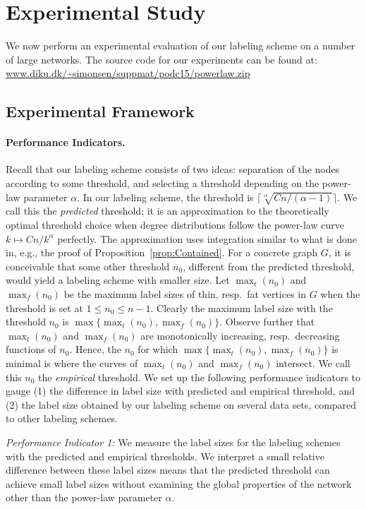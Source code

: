 \documentclass{article}
\theoremstyle{remark}
\begin{document}
\section{Experimental Study}

We now  perform an experimental evaluation of our labeling scheme on a number of large networks.
The source code for our experiments can be found at: \url{www.diku.dk/\~simonsen/suppmat/podc15/powerlaw.zip}

\subsection{Experimental Framework}\label{Sec:Experimental}
\paragraph{Performance Indicators.}
Recall that our labeling scheme consists of two ideas: separation of the nodes according to some threshold, and selecting a threshold depending on the power-law parameter $\alpha$.
In our labeling scheme, the threshold  is $\lceil \sqrt[\alpha]{C n/(\alpha-1)} \rceil$. We call this the \emph{predicted} threshold; it is an approximation to the theoretically optimal threshold choice when degree distributions follow the power-law curve $k\mapsto Cn/k^\alpha$ perfectly. The approximation uses integration similar to what is done in, e.g., the proof of Proposition~\ref{prop:Contained}.
For a concrete
graph $G$, it is conceivable that some other threshold $n_0$, different from the predicted threshold, would yield a labeling scheme with smaller size. 
Let $\max_t(n_0)$ and $\max_f(n_0)$ be the maximum label sizes of thin, resp.\ fat vertices in $G$ when the threshold is set at $1 \leq n_0 \leq n-1$. Clearly
the maximum label size with the threshold $n_0$ is $\max\{\max_t(n_0),\max_f(n_0)\}$. Observe further
that $\max_t(n_0)$ and $\max_f(n_0)$ are monotonically increasing, resp.\ decreasing functions of $n_0$. Hence,
the $n_0$ for which $\max\{\max_t(n_0),\max_f(n_0)\}$ is minimal is where the curves of $\max_t(n_0)$ and $\max_f(n_0)$ intersect. We call this $n_0$ the \emph{empirical} threshold.
We set up the following performance indicators to gauge (1) the difference in label size with predicted and empirical threshold, and (2) the label size obtained by our labeling scheme on several data sets, compared to other labeling schemes.

\emph{Performance Indicator 1:} We measure the label sizes for the labeling schemes with the predicted and empirical thresholds. We interpret a small relative difference between these label sizes means that the predicted threshold can achieve small label sizes without examining the global properties of the network other than the power-law parameter $\alpha$. 
 
\end{document}
